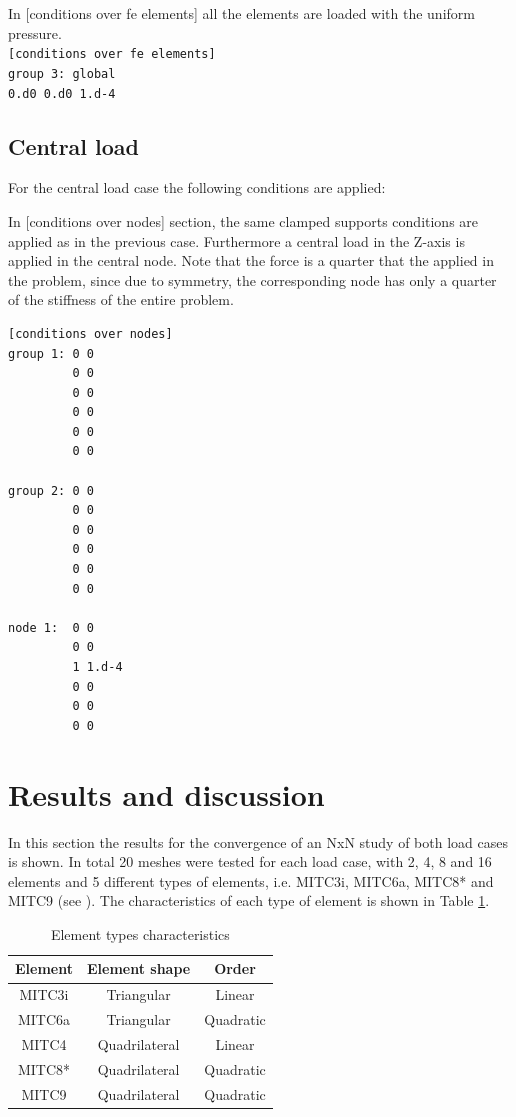 \documentclass[11pt]{article}
\begin{document}
	In [conditions over fe elements] all the elements are loaded with the uniform pressure.\\
	
	\texttt{[conditions over fe elements]\\
		group 3: global\\
		\hspace*{1.8cm} 0.d0 0.d0 1.d-4}
		
	\subsection*{Central load}
	
	For the central load case the following conditions are applied:
	
	In [conditions over nodes] section, the same clamped supports conditions are applied as in the previous case. Furthermore a central load in the Z-axis is applied in the central node. Note that the force is a quarter that the applied in the problem, since due to symmetry, the corresponding node has only a quarter of the stiffness of the entire problem.
	
	\begin{verbatim}
[conditions over nodes]
group 1: 0 0
         0 0
         0 0
         0 0
         0 0
         0 0
	
group 2: 0 0
         0 0
         0 0
         0 0
         0 0
         0 0
         
node 1:  0 0
         0 0
         1 1.d-4
         0 0
         0 0
         0 0
	\end{verbatim}
			
	\section*{Results and discussion}
	
	In this section the results for the convergence of an NxN study of both load cases is shown. In total 20 meshes were tested for each load case, with 2, 4, 8 and 16 elements and 5 different types of elements, i.e. MITC3i, MITC6a, MITC8* and MITC9 (see \cite{Bathe2006}). The characteristics of each type of element is shown in Table \ref{MITC_tab}.
	
	\begin{table}[H]
	\caption{Element types characteristics}
	\label{MITC_tab}
	\centering
	\begin{tabular}{|c|c|c|}
		\hline
		\textbf{Element} & \textbf{Element shape} & \textbf{Order} \\
		\hline
		MITC3i & Triangular & Linear \\
		\hline
		MITC6a & Triangular & Quadratic \\
		\hline
		MITC4 & Quadrilateral & Linear \\
		\hline
		MITC8* & Quadrilateral & Quadratic \\
		\hline
		MITC9 & Quadrilateral & Quadratic \\
		\hline
	\end{tabular}
\end{table}
	
\end{document}
